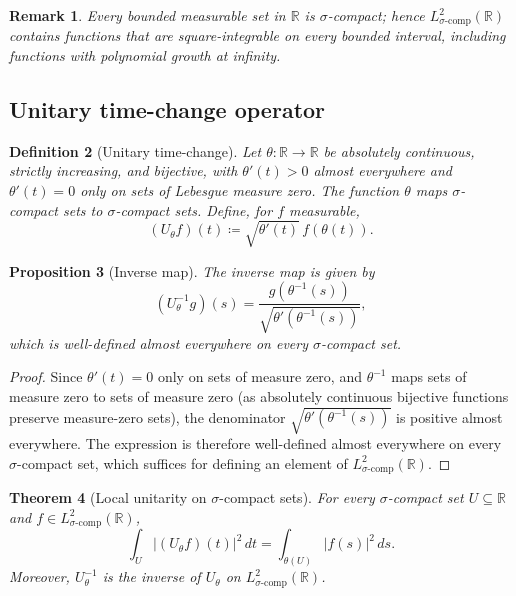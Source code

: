 \documentclass{article}
\newtheorem{theorem}{Theorem}[section]
\newtheorem{proposition}[theorem]{Proposition}
\newtheorem{definition}[theorem]{Definition}
\newtheorem{remark}[theorem]{Remark}
\begin{document}
\begin{remark}
Every bounded measurable set in $\mathbb{R}$ is $\sigma$-compact; hence $L^2_{\sigma\text{-comp}}(\mathbb{R})$ contains functions that are square-integrable on every bounded interval, including functions with polynomial growth at infinity.
\end{remark}

\subsection{Unitary time-change operator}
\begin{definition}[Unitary time-change]\label{def:Utheta}
Let $\theta:\mathbb{R}\to\mathbb{R}$ be absolutely continuous, strictly increasing, and bijective, with $\theta'(t)>0$ almost everywhere and $\theta'(t)=0$ only on sets of Lebesgue measure zero. The function $\theta$ maps $\sigma$-compact sets to $\sigma$-compact sets. Define, for $f$ measurable,
\[
(U_\theta f)(t)\coloneqq \sqrt{\theta'(t)}\,f(\theta(t)).
\]
\end{definition}

\begin{proposition}[Inverse map]\label{prop:inverse}
The inverse map is given by
\[
(U_\theta^{-1}g)(s)=\frac{g(\theta^{-1}(s))}{\sqrt{\theta'(\theta^{-1}(s))}},
\]
which is well-defined almost everywhere on every $\sigma$-compact set.
\end{proposition}

\begin{proof}
Since $\theta'(t)=0$ only on sets of measure zero, and $\theta^{-1}$ maps sets of measure zero to sets of measure zero (as absolutely continuous bijective functions preserve measure-zero sets), the denominator $\sqrt{\theta'(\theta^{-1}(s))}$ is positive almost everywhere. The expression is therefore well-defined almost everywhere on every $\sigma$-compact set, which suffices for defining an element of $L^2_{\sigma\text{-comp}}(\mathbb{R})$.
\end{proof}

\begin{theorem}[Local unitarity on $\sigma$-compact sets]\label{thm:local_unitarity}
For every $\sigma$-compact set $U\subseteq\mathbb{R}$ and $f\in L^2_{\sigma\text{-comp}}(\mathbb{R})$,
\[
\int_U |(U_\theta f)(t)|^2\,dt=\int_{\theta(U)} |f(s)|^2\,ds.
\]
Moreover, $U_\theta^{-1}$ is the inverse of $U_\theta$ on $L^2_{\sigma\text{-comp}}(\mathbb{R})$.
\end{theorem}
\end{document}
